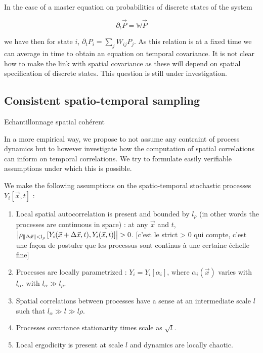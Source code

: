 In the case of a master equation on probabilities of discrete states of the system

\begin{equation}
\partial_t \vec{P} = \mathbb{W} \vec{P}
\end{equation}

we have then for state $i$, $\partial_t P_i = \sum_j W_{ij}P_j$. As this relation is at a fixed time we can average in time to obtain an equation on temporal covariance. It is not clear how to make the link with spatial covariance as these will depend on spatial specification of discrete states. This question is still under investigation.


\subsection{Consistent spatio-temporal sampling}{Echantillonnage spatial cohérent}

In a more empirical way, we propose to not assume any contraint of process dynamics but to however investigate how the computation of spatial correlations can inform on temporal correlations. We try to formulate easily verifiable assumptions under which this is possible.

We make the following assumptions on the spatio-temporal stochastic processes $Y_i\left[\vec{x},t\right]$ :
\begin{enumerate}
\item Local spatial autocorrelation is present and bounded by $l_{\rho}$ (in other words the processes are continuous in space) : at any $\vec{x}$ and $t$, $\left|\rho_{\| \Delta \vec{x} \| < l_{\rho}}\left[Y_i (\vec{x}+\Delta \vec{x},t), Y_i (\vec{x},t) \right]\right| > 0$. [c'est le strict > 0 qui compte, c'est une façon de postuler que les processus sont continus à une certaine échelle fine]
\item Processes are locally parametrized : $Y_i = Y_i\left[\alpha_i\right]$, where $\alpha_i (\vec{x})$ varies with $l_{\alpha}$, with $l_{\alpha} \gg l_{\rho}$.
\item Spatial correlations between processes have a sense at an intermediate scale $l$ such that $l_{\alpha}\gg l \gg l{\rho}$.
\item Processes covariance stationarity times scale as $\sqrt{l}$.
\item Local ergodicity is present at scale $l$ and dynamics are locally chaotic.
\end{enumerate}


